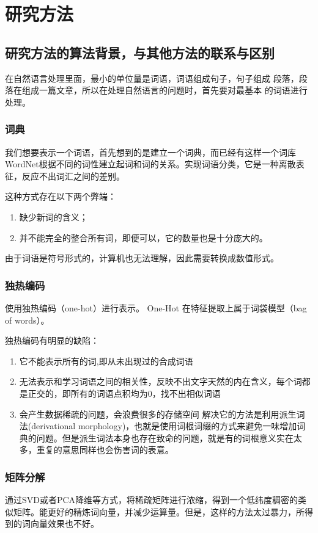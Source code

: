 \documentclass{article}
\begin{document}
\section{研究方法}

\subsection{研究方法的算法背景，与其他方法的联系与区别}
在自然语言处理里面，最小的单位量是词语，词语组成句子，句子组成 段落，段落在组成一篇文章，所以在处理自然语言的问题时，首先要对最基本 的词语进行处理。\par
\subsubsection{词典}
我们想要表示一个词语，首先想到的是建立一个词典，而已经有这样一个词库WordNet\cite{2002Review}根据不同的词性建立起词和词的关系。实现词语分类，它是一种离散表征，反应不出词汇之间的差别。\par
这种方式存在以下两个弊端：
\begin{enumerate}

\item 缺少新词的含义；
\item 并不能完全的整合所有词，即便可以，它的数量也是十分庞大的。
\end{enumerate}
由于词语是符号形式的，计算机也无法理解，因此需要转换成数值形式。
\subsubsection{独热编码}
使用独热编码（one-hot）进行表示。 One-Hot 在特征提取上属于词袋模型（bag of words）。\par
 独热编码有明显的缺陷：
 \begin{enumerate}
\item 它不能表示所有的词,即从未出现过的合成词语
\item 无法表示和学习词语之间的相关性，反映不出文字天然的内在含义，每个词都是正交的，即所有的词语点积均为0，找不出相似词语
\item 会产生数据稀疏的问题，会浪费很多的存储空间
解决它的方法是利用派生词法(derivational morphology)，也就是使用词根词缀的方式来避免一味增加词典的问题。但是派生词法本身也存在致命的问题，就是有的词根意义实在太多，重复的意思同样也会伤害词的表意。
\end{enumerate}
\subsubsection{矩阵分解}
通过SVD或者PCA降维等方式，将稀疏矩阵进行浓缩，得到一个低纬度稠密的类似矩阵。能更好的精炼词向量，并减少运算量。但是，这样的方法太过暴力，所得到的词向量效果也不好。
\end{document}
